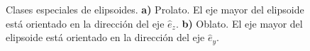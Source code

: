 
\begin{figure}[h!]
	\quad%
	\caption{Clases especiales de elipsoides. \textbf{a)} Prolato. El eje mayor del elipsoide está orientado en la dirección del eje $\hat{e}_z$. \textbf{b)} Oblato. El eje mayor del elipsoide está orientado en la dirección del eje $\hat{e}_y$.}\label{fig:test}
\end{figure}

